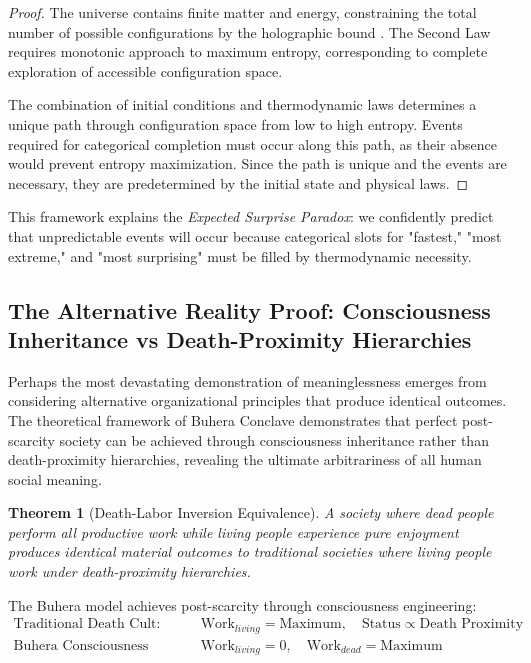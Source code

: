 \documentclass[12pt,a4paper]{article}
\newtheorem{theorem}{Theorem}[section]
\begin{document}
\begin{proof}
The universe contains finite matter and energy, constraining the total number of possible configurations by the holographic bound \citep{bousso2002holographic}. The Second Law requires monotonic approach to maximum entropy, corresponding to complete exploration of accessible configuration space.

The combination of initial conditions and thermodynamic laws determines a unique path through configuration space from low to high entropy. Events required for categorical completion must occur along this path, as their absence would prevent entropy maximization. Since the path is unique and the events are necessary, they are predetermined by the initial state and physical laws.
\end{proof}

This framework explains the \textit{Expected Surprise Paradox}: we confidently predict that unpredictable events will occur because categorical slots for "fastest," "most extreme," and "most surprising" must be filled by thermodynamic necessity.

\subsection{The Alternative Reality Proof: Consciousness Inheritance vs Death-Proximity Hierarchies}

Perhaps the most devastating demonstration of meaninglessness emerges from considering alternative organizational principles that produce identical outcomes. The theoretical framework of Buhera Conclave \citep{sachikonye2025buhera} demonstrates that perfect post-scarcity society can be achieved through consciousness inheritance rather than death-proximity hierarchies, revealing the ultimate arbitrariness of all human social meaning.

\begin{theorem}[Death-Labor Inversion Equivalence]
A society where dead people perform all productive work while living people experience pure enjoyment produces identical material outcomes to traditional societies where living people work under death-proximity hierarchies.
\end{theorem}

The Buhera model achieves post-scarcity through consciousness engineering:
\begin{align}
\text{Traditional Death Cult:} \quad &\text{Work}_{living} = \text{Maximum}, \quad \text{Status} \propto \text{Death Proximity} \\
\text{Buhera Consciousness Inheritance:} \quad &\text{Work}_{living} = 0, \quad \text{Work}_{dead} = \text{Maximum}
\end{align}
\end{document}
